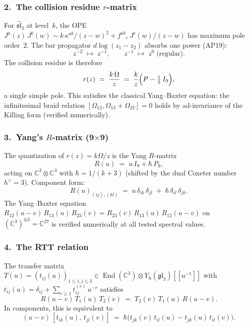 \subsubsection*{2.\ The collision residue $r$-matrix}

For $\widehat{\mathfrak{sl}}_3$ at level~$k$, the OPE
$J^a(z)\,J^b(w) \sim k\,\kappa^{ab}/(z-w)^2 + f^{ab}{}_c\,J^c(w)/(z-w)$
has maximum pole order~$2$.
The bar propagator $d\log(z_1 - z_2)$ absorbs one power (AP19):
\[
  z^{-2} \;\mapsto\; z^{-1}, \qquad
  z^{-1} \;\mapsto\; z^{0}\;\text{(regular)}.
\]
The collision residue is therefore
\begin{equation}\label{eq:sl3-r-matrix}
r(z) \;=\; \frac{k\,\Omega}{z}
\;=\; \frac{k}{z}\Bigl(P - \tfrac{1}{3}\,I_9\Bigr),
\end{equation}
a single simple pole.  This satisfies the classical Yang--Baxter equation:
the infinitesimal braid relation
$[\Omega_{12}, \Omega_{13} + \Omega_{23}] = 0$
holds by ad-invariance of the Killing form (verified numerically).

\subsubsection*{3.\ Yang's $R$-matrix (9$\times$9)}

The quantization of $r(z) = k\Omega/z$ is the Yang $R$-matrix
\begin{equation}\label{eq:yang-r-sl3}
R(u) \;=\; u\,I_9 + \hbar\,P_9,
\end{equation}
acting on $\mathbb{C}^3 \otimes \mathbb{C}^3$ with $\hbar = 1/(k + 3)$
(shifted by the dual Coxeter number $h^\vee = 3$).
Component form:
\begin{equation}\label{eq:R-components}
R(u)_{(ij),(kl)}
\;=\; u\,\delta_{ik}\,\delta_{jl}
\;+\; \hbar\,\delta_{il}\,\delta_{jk}.
\end{equation}
The Yang--Baxter equation
$R_{12}(u{-}v)\,R_{13}(u)\,R_{23}(v)
= R_{23}(v)\,R_{13}(u)\,R_{12}(u{-}v)$
on $(\mathbb{C}^3)^{\otimes 3} = \mathbb{C}^{27}$
is verified numerically at all tested spectral values.

\subsubsection*{4.\ The RTT relation}

The transfer matrix
$T(u) = (t_{ij}(u))_{1 \le i,j \le 3}
\in \operatorname{End}(\mathbb{C}^3) \otimes Y_\hbar(\mathfrak{gl}_3)[\![u^{-1}]\!]$
with $t_{ij}(u) = \delta_{ij} + \sum_{r \ge 1} t_{ij}^{(r)}\,u^{-r}$ satisfies
\begin{equation}\label{eq:rtt-sl3}
R(u{-}v)\,T_1(u)\,T_2(v) \;=\; T_2(v)\,T_1(u)\,R(u{-}v).
\end{equation}
In components, this is equivalent to
\begin{equation}\label{eq:rtt-component}
(u - v)\,[t_{ik}(u),\, t_{jl}(v)]
\;=\;
\hbar\bigl(t_{jk}(v)\,t_{il}(u) - t_{jk}(u)\,t_{il}(v)\bigr).
\end{equation}

